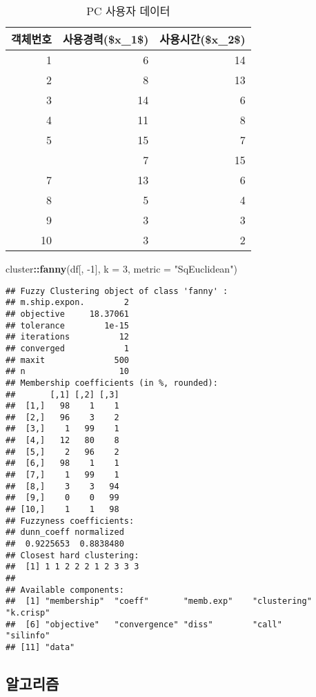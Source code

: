\documentclass[]{book}
\newenvironment{Shaded}{\begin{snugshade}}{\end{snugshade}}
\newcommand{\DataTypeTok}[1]{\textcolor[rgb]{0.13,0.29,0.53}{#1}}
\newcommand{\DecValTok}[1]{\textcolor[rgb]{0.00,0.00,0.81}{#1}}
\newcommand{\KeywordTok}[1]{\textcolor[rgb]{0.13,0.29,0.53}{\textbf{#1}}}
\newcommand{\NormalTok}[1]{#1}
\newcommand{\OperatorTok}[1]{\textcolor[rgb]{0.81,0.36,0.00}{\textbf{#1}}}
\newcommand{\StringTok}[1]{\textcolor[rgb]{0.31,0.60,0.02}{#1}}
\begin{document}
\begin{table}[t]

\caption{\label{tab:fuzzy-kmeans-data}PC 사용자 데이터}
\centering
\begin{tabular}{rrr}
\toprule
객체번호 & 사용경력(\$x\_1\$) & 사용시간(\$x\_2\$)\\
\midrule
1 & 6 & 14\\
2 & 8 & 13\\
3 & 14 & 6\\
4 & 11 & 8\\
5 & 15 & 7\\
\addlinespace
6 & 7 & 15\\
7 & 13 & 6\\
8 & 5 & 4\\
9 & 3 & 3\\
10 & 3 & 2\\
\bottomrule
\end{tabular}
\end{table}

\begin{Shaded}
\begin{Highlighting}[]
\NormalTok{cluster}\OperatorTok{::}\KeywordTok{fanny}\NormalTok{(df[, }\DecValTok{-1}\NormalTok{], }\DataTypeTok{k =} \DecValTok{3}\NormalTok{, }\DataTypeTok{metric =} \StringTok{"SqEuclidean"}\NormalTok{)}
\end{Highlighting}
\end{Shaded}

\begin{verbatim}
## Fuzzy Clustering object of class 'fanny' :                      
## m.ship.expon.        2
## objective     18.37061
## tolerance        1e-15
## iterations          12
## converged            1
## maxit              500
## n                   10
## Membership coefficients (in %, rounded):
##       [,1] [,2] [,3]
##  [1,]   98    1    1
##  [2,]   96    3    2
##  [3,]    1   99    1
##  [4,]   12   80    8
##  [5,]    2   96    2
##  [6,]   98    1    1
##  [7,]    1   99    1
##  [8,]    3    3   94
##  [9,]    0    0   99
## [10,]    1    1   98
## Fuzzyness coefficients:
## dunn_coeff normalized 
##  0.9225653  0.8838480 
## Closest hard clustering:
##  [1] 1 1 2 2 2 1 2 3 3 3
## 
## Available components:
##  [1] "membership"  "coeff"       "memb.exp"    "clustering"  "k.crisp"    
##  [6] "objective"   "convergence" "diss"        "call"        "silinfo"    
## [11] "data"
\end{verbatim}

\hypertarget{fuzzy-kmeans-algorithm}{%
\subsection{알고리즘}\label{fuzzy-kmeans-algorithm}}
\end{document}
